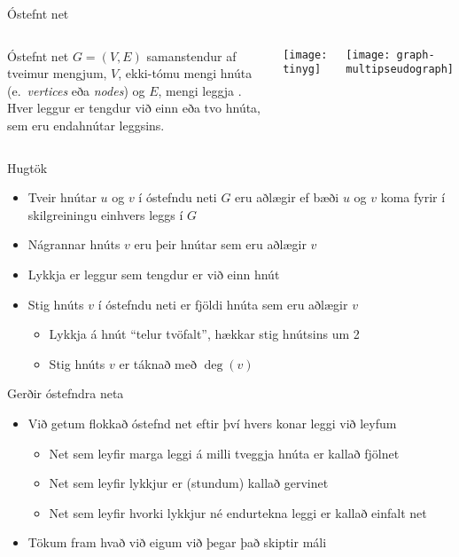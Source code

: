 \documentclass{beamer}
\begin{document}
\begin{frame}{Óstefnt net}
	\begin{columns}
		\begin{tcolorbox}[title=Óstefnt net]
			Óstefnt net  $G = (V, E)$ samanstendur af tveimur mengjum, $V$, ekki-tómu mengi hnúta (e.\ \emph{vertices} eða \emph{nodes}) og $E$, mengi leggja . Hver leggur er tengdur við einn eða tvo hnúta, sem eru endahnútar  leggsins.
		\end{tcolorbox}
		\texttt{[image: tinyg]}

		\begin{center}
			\texttt{[image: graph-multipseudograph]}
		\end{center}
	\end{columns}
\end{frame}


\begin{frame}{Hugtök}
	\begin{itemize}
		\item Tveir hnútar $u$ og $v$ í óstefndu neti $G$ eru aðlægir  ef bæði $u$ og $v$ koma fyrir í skilgreiningu einhvers leggs í $G$
		\item Nágrannar  hnúts $v$ eru þeir hnútar sem eru aðlægir $v$
		\item Lykkja  er leggur sem tengdur er við einn hnút
		\item Stig  hnúts $v$ í óstefndu neti er fjöldi hnúta sem eru aðlægir $v$
		      \begin{itemize}
			      \item Lykkja á hnút ``telur tvöfalt'', hækkar stig hnútsins um 2
			      \item Stig hnúts $v$ er táknað með $\deg(v)$
		      \end{itemize}
	\end{itemize}
\end{frame}

\begin{frame}{Gerðir óstefndra neta}
	\begin{itemize}
		\item Við getum flokkað óstefnd net eftir því hvers konar leggi við leyfum
		      \begin{itemize}
			      \item Net sem leyfir marga leggi á milli tveggja hnúta er kallað fjölnet 
			      \item Net sem leyfir lykkjur er (stundum) kallað gervinet 
			      \item Net sem leyfir hvorki lykkjur né endurtekna leggi er kallað einfalt net 
		      \end{itemize}
		\item Tökum fram hvað við eigum við þegar það skiptir máli
	\end{itemize}
\end{frame}
\end{document}
